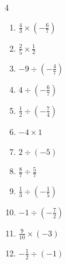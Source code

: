\begin{multicols}{4}
\begin{enumerate}
  \item $\displaystyle \frac{4}{3}\times{}\left(-\frac{6}{7}\right)$


  \item $\displaystyle \frac{2}{5}\times{}\frac{1}{2}$


  \item $\displaystyle -9\div{}\left(-\frac{4}{7}\right)$


\columnbreak %

  \item $\displaystyle 4\div{}\left(-\frac{6}{7}\right)$


  \item $\displaystyle \frac{1}{2}\div{}\left(-\frac{7}{4}\right)$


  \item $\displaystyle -4\times{}1$

        \phantom{$\displaystyle =-4$}

  \item $\displaystyle 2\div{}\left(-5\right)$


  \item $\displaystyle \frac{8}{7}\div{}\frac{5}{7}$


  \item $\displaystyle \frac{1}{3}\div{}\left(-\frac{1}{5}\right)$


  \item $\displaystyle -1\div{}\left(-\frac{7}{2}\right)$


  \item $\displaystyle \frac{9}{10}\times{}\left(-3\right)$


  \item $\displaystyle -\frac{1}{2}\div{}\left(-1\right)$


\end{enumerate}
\end{multicols}

